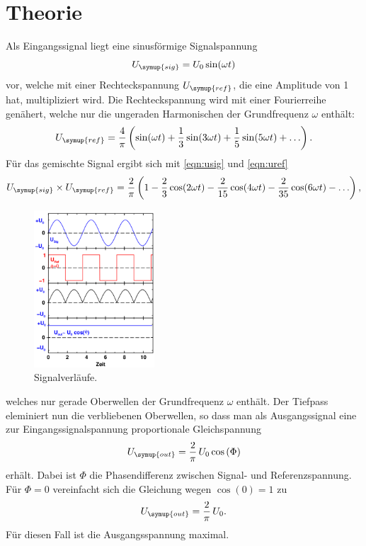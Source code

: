   \section{Theorie}
  Als Eingangssignal liegt eine sinusförmige Signalspannung
  \begin{equation}
    U_\symup{sig} = U_0 \sin(\omega t)
    \label{eqn:usig}
  \end{equation}
  vor, welche mit einer Rechteckspannung $U_\symup{ref}$, die eine Amplitude von
  1 hat, multipliziert wird.
  Die Rechteckspannung wird mit einer Fourierreihe genähert, welche nur die ungeraden
  Harmonischen der Grundfrequenz $\omega$ enthält:
  \begin{equation}
    U_\symup{ref}=\frac{4}{\pi}\left(\sin(\omega t) + \frac{1}{3}\sin(3\omega t)
    + \frac{1}{5}\sin(5\omega t) + \ldots\right).
    \label{eqn:uref}
  \end{equation}
  Für das gemischte Signal ergibt sich mit \eqref{eqn:usig} und \eqref{eqn:uref}
  \begin{equation}
    U_\symup{sig}\times U_\symup{ref} = \frac{2}{\pi}\left(1-\frac{2}{3}\cos(2\omega t)
    -\frac{2}{15}\cos(4\omega t) -\frac{2}{35}\cos(6\omega t) - \ldots\right),
    \label{eqn:umisch}
  \end{equation}
  \begin{figure}
    \centering
    \vspace{-15pt}
    \includegraphics[width=0.4\textwidth]{signalverlaeufe.png}
    \caption{Signalverläufe\cite{sample}.}
    \label{fig:signalverlaeufe}
  \end{figure}
  welches nur gerade Oberwellen der Grundfrequenz $\omega$ enthält.
  Der Tiefpass eleminiert nun die verbliebenen Oberwellen, so dass man als Ausgangssignal
  eine zur Eingangssignalspannung proportionale Gleichspannung
  \begin{equation}
    U_\symup{out}=\frac{2}{\pi}\,U_0 \cos\,(\Phi)
    \label{eqn:uout1}
  \end{equation}
  erhält. Dabei ist $\Phi$ die Phasendifferenz zwischen Signal- und Referenzspannung.
  Für $\Phi = 0$ vereinfacht sich die Gleichung wegen $\cos(0)=1$ zu
  \begin{equation}
    U_\symup{out}=\frac{2}{\pi}\,U_0.
    \label{eqn:uout2}
  \end{equation}
  Für diesen Fall ist die Ausgangsspannung maximal.
\cite{sample}
